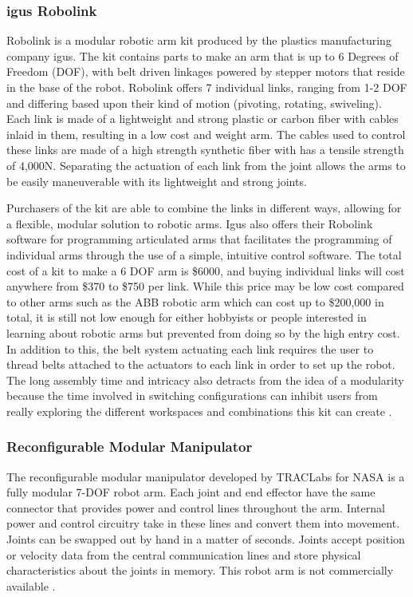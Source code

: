\subsubsection{igus Robolink} 
Robolink is a modular robotic arm kit produced by the plastics manufacturing company igus. The kit contains parts to make an arm that is up to 6 Degrees of Freedom (DOF), with belt driven linkages powered by stepper motors that reside in the base of the robot. Robolink offers 7 individual links, ranging from 1-2 DOF and differing based upon their kind of motion (pivoting, rotating, swiveling). Each link is made of a lightweight and strong plastic or carbon fiber with cables inlaid in them, resulting in a low cost and weight arm. The cables used to control these links are made of a high strength synthetic fiber with has a tensile strength of 4,000N. Separating the actuation of each link from the joint allows the arms to be easily maneuverable with its lightweight and strong joints.

\noindent Purchasers of the kit are able to combine the links in different ways, allowing for a flexible, modular solution to robotic arms. Igus also offers their Robolink software for programming articulated arms that facilitates the programming of individual arms through the use of a simple, intuitive control software. The total cost of a kit to make a 6 DOF arm is \$6000, and buying individual links will cost anywhere from \$370 to \$750 per link. While this price may be low cost compared to other arms such as the ABB robotic arm which can cost up to \$200,000 in total, it is still not low enough for either hobbyists or people interested in learning about robotic arms but prevented from doing so by the high entry cost. In addition to this, the belt system actuating each link requires the user to thread belts attached to the actuators to each link in order to set up the robot. The long assembly time and intricacy also detracts from the idea of a modularity because the time involved in switching configurations can inhibit users from really exploring the different workspaces and combinations this kit can create \cite{igus}. 

\subsubsection{Reconfigurable Modular Manipulator}
The reconfigurable modular manipulator developed by TRACLabs for NASA is a fully modular 7-DOF robot arm. Each joint and end effector have the same connector that provides power and control lines throughout the arm. Internal power and control circuitry take in these lines and convert them into movement. Joints can be swapped out by hand in a matter of seconds. Joints accept position or velocity data from the central communication lines and store physical characteristics about the joints in memory. This robot arm is not commercially available \cite{RMM}.

